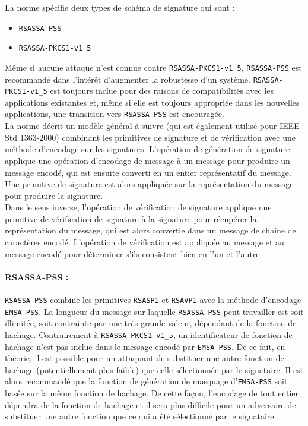 La norme spécifie deux types de schéma de signature qui sont :
\begin{itemize}
\item \texttt{RSASSA-PSS}
\item \texttt{RSASSA-PKCS1-v1\_5} \\
\end{itemize}

Même si aucune attaque n'est connue contre \texttt{RSASSA-PKCS1-v1\_5},  \texttt{RSASSA-PSS} est recommandé dans l'intérêt d'augmenter la robustesse d'un système. \texttt{RSASSA-PKCS1-v1\_5} est toujours inclue pour des raisons de compatibilités avec les applications existantes et, même si elle est toujours appropriée dans les nouvelles applications, une transition vers \texttt{RSASSA-PSS} est encouragée.\\ 


La norme décrit un modèle général à suivre (qui est également utilisé pour IEEE Std 1363-2000) combinant les primitives de signature et de vérification avec une méthode d'encodage sur les signatures. L'opération de génération de signature applique une opération d'encodage de message à un message pour produire un message encodé, qui est ensuite converti en un entier représentatif du message. Une primitive de signature est alors appliquée sur la représentation du message pour produire la signature.\\ 


Dans le sens inverse, l'opération de vérification de signature applique une primitive de vérification de signature à la signature pour récupérer la représentation du message, qui est alors convertie dans un message de chaîne de caractères encodé. L'opération de vérification est appliquée au message et au message encodé pour déterminer s'ils  consistent bien en l'un et l'autre.\\ 


\paragraph{RSASSA-PSS : \\}
\texttt{RSASSA-PSS} combine les primitives \texttt{RSASP1} et \texttt{RSAVP1} avec la méthode d'encodage \texttt{EMSA-PSS}. La longueur du message sur laquelle \texttt{RSASSA-PSS} peut travailler est soit illimitée, soit contrainte par une très grande valeur, dépendant de la fonction de hachage. Contrairement à \texttt{RSASSA-PKCS1-v1\_5}, un identificateur de fonction de hachage n'est pas inclue dans le message encodé par \texttt{EMSA-PSS}. De ce fait, en théorie, il est possible pour un attaquant de substituer une autre fonction de hachage (potentiellement plus faible) que celle sélectionnée par le signataire. Il est alors recommandé que la fonction de génération de masquage d'\texttt{EMSA-PSS} soit basée sur la même fonction de hachage. De cette façon, l'encodage de tout entier dépendra de la fonction de hachage et il sera plus difficile pour un adversaire de substituer une autre fonction que ce qui a été sélectionné par le signataire.\\


